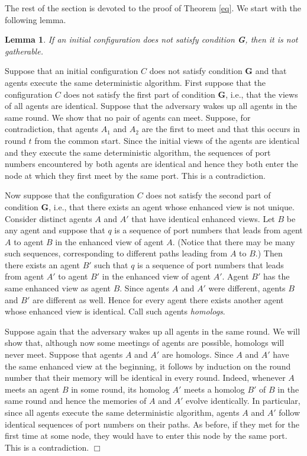 \documentclass[11pt]{article}
\newtheorem{lemma}{Lemma}[section]
\newcommand{\qed}{\hfill $\Box$ \bigbreak}
\newenvironment{proof}{\noindent {\bf Proof.}}{\qed}
\begin{document}
The rest of the section is devoted to the proof of Theorem \ref{eq}.
We start with the following lemma.

\begin{lemma}\label{not}
If an initial configuration does not satisfy condition {\bf G}, then it is not gatherable.
\end{lemma}

\begin{proof}
Suppose that an initial configuration $C$ does not satisfy condition {\bf G} and that agents execute the same deterministic algorithm.
First suppose that the configuration $C$ does not satisfy the first part of condition  {\bf G}, i.e., that the views of all agents are identical.
Suppose that the adversary wakes up all agents in the same round. We show that no pair of agents can meet. Suppose, for contradiction, that 
agents $A_1$ and $A_2$ are the first to meet and that this occurs in round $t$ from the common start. Since the initial views of the agents are identical
and they execute the same deterministic algorithm, the sequences of port numbers encountered by both agents are identical and hence they both
enter the node at which they first meet by the same port. This is a contradiction.

Now suppose that the configuration $C$ does not satisfy the second part of condition  {\bf G}, i.e., that there exists an agent whose enhanced view is not unique. 
Consider distinct agents
$A$ and $A'$ that have identical enhanced views. Let $B$ be any agent and suppose that  $q$ is a sequence of port numbers that leads
from agent $A$ to agent $B$ in the enhanced view of agent $A$. (Notice that there may be many such sequences, corresponding to different paths 
leading from $A$ to $B$.) Then there exists an agent $B'$ such that $q$ is a sequence of port numbers that leads
from agent $A'$ to agent $B'$ in the enhanced view of agent $A'$. Agent $B'$ has the same enhanced view as agent $B$. 
Since agents $A$ and $A'$ were different, agents $B$ and $B'$ are different as well. Hence for every agent there exists another agent whose enhanced view
is identical. Call such agents {\em homologs}.

Suppose again that the adversary wakes up all agents in the same round. We will show that, although now some meetings of agents are possible, homologs will
never meet. Suppose that agents $A$ and $A'$ are homologs. Since $A$ and $A'$ have the same enhanced view at the beginning, it follows by induction
on the round number that their memory will be identical in every round. Indeed, whenever $A$ meets an agent $B$ in some round, its homolog $A'$ meets
a homolog $B'$ of $B$ in the same round and hence the memories of $A$ and $A'$ evolve identically. In particular, since all agents execute the same
deterministic algorithm, agents $A$ and $A'$ follow identical sequences of port numbers on their paths. As before, if they met for the first time at some node, they
would have to enter this node by the same port. This is a contradiction.
 \end{proof}
 
\end{document}
